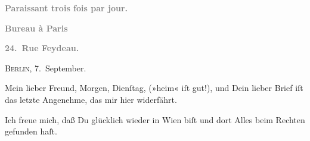 \pstart
           \begin{otherlanguage}{french}\textcolor{gray}{\textbf{\textbf{Paraissant trois fois par jour.}}}\end{otherlanguage}\pend
           
\pstart
           \begin{otherlanguage}{french}\textcolor{gray}{\textbf{\textbf{Bureau à Paris}}}\end{otherlanguage}\pend
           
\pstart
           \begin{otherlanguage}{french}\textcolor{gray}{\textbf{\textbf{24. Rue Feydeau.}}}\end{otherlanguage}\hfill \textsc{Berlin}, 7. September.\pend
           
\pstart\center{}Mein lieber Freund,\pend\vspace{0.5em}
\pstart
           Morgen, Dienſtag, \label{K_L02784-1v}\label{K_L02784-1} (»heim« iſt gut!), und Dein lieber Brief iſt das letzte Angenehme,
               das mir hier widerfährt.\pend
           
\pstart
           Ich freue mich, daß Du glücklich wieder in Wien
               biſt und dort Alles beim Rechten gefunden haſt.\pend
           

